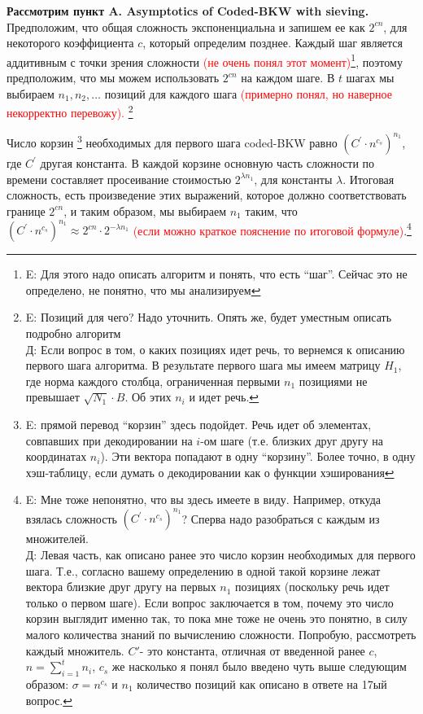 \documentclass[a4paper,11pt]{article}
\begin{document}
\textbf{Рассмотрим пункт A. Asymptotics of Coded-BKW with sieving.}\\

Предположим, что общая сложность экспоненциальна и запишем ее как $2^{cn}$, для некоторого коэффициента $c$, который определим позднее. Каждый шаг является аддитивным с точки зрения сложности \textcolor{red}{(не очень понял этот момент)}\footnote{E: Для этого надо описать алгоритм и понять, что есть ``шаг''. Сейчас это не определено, не понятно, что мы анализируем}, поэтому предположим, что мы можем использовать $2^{cn}$ на каждом шаге. В $t$ шагах мы выбираем $n_1,n_2,…$ позиций для каждого шага  \textcolor{red}{(примерно понял, но наверное некорректно перевожу). \footnote{E: Позиций для чего? Надо уточнить. Опять же, будет уместным описать подробно алгоритм \\ Д: Если вопрос в том, о каких позициях идет речь, то вернемся к описанию первого шага алгоритма. В результате первого шага мы имеем матрицу $H_1$, где норма каждого столбца, ограниченная первыми $n_1$ позициями не превышает $\sqrt{N_1}\cdot B$. Об этих $n_i$ и идет речь.}}

Число корзин \footnote{E: прямой перевод ``корзин'' здесь подойдет. Речь идет об элементах, совпавших при декодировании на $i$-ом шаге (т.е. близких друг другу на координатах $n_i$). Эти вектора попадают в одну ``корзину''. Более точно, в одну хэш-таблицу, если думать о декодировании как о функции хэширования} необходимых для первого шага coded-BKW равно $(C^{'} \cdot n^{c_s})^{n_1}$, где $C^{'}$ другая константа. В каждой корзине основную часть сложности по времени составляет просеивание стоимостью $2^{\lambda n_1}$, для константы $\lambda$. Итоговая сложность, есть произведение этих выражений, которое должно соответствовать границе $2^{cn}$, и таким образом, мы выбираем $n_1$ таким, что $(C^{'} \cdot n^{c_s})^{n_1} \approx 2^{cn} \cdot 2^{- \lambda n_1}$ \textcolor{red}{(если можно краткое пояснение по итоговой формуле)}.\footnote{E: Мне тоже непонятно, что вы здесь имеете в виду. Например, откуда взялась сложность $(C^{'} \cdot n^{c_s})^{n_1}$? Сперва надо разобраться с каждым из множителей. \\ Д: Левая часть, как описано ранее это число корзин необходимых для первого шага. Т.е., согласно вашему определению в одной такой корзине лежат вектора близкие друг другу на первых $n_1$ позициях (поскольку речь идет только о первом шаге). Если вопрос заключается в том, почему это число корзин выглядит именно так, то пока мне тоже не очень это понятно, в силу малого количества знаний по вычислению сложности. Попробую, рассмотреть каждый множитель. $C'$- это константа, отличная от введенной ранее $c$, $n = \sum_{i=1}^{t} n_i$, $c_s$ же насколько я понял было введено чуть выше следующим образом: $\sigma = n^{c_s}$ и $n_1$ количество позиций как описано в ответе на 17ый вопрос.}
\end{document}
